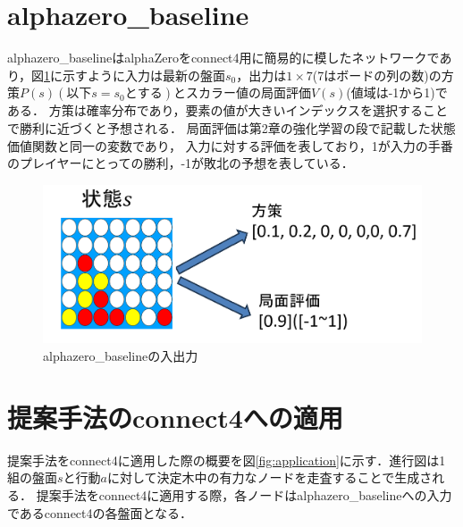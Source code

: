 \section{alphazero\_baseline}
alphazero\_baselineはalphaZeroをconnect4用に簡易的に模したネットワークであり，図\ref{fig:baseline}に示すように入力は最新の盤面$s_0$，出力は$1\times7$(7はボードの列の数)の方策$P(s)(以下s=s_0とする)$とスカラー値の局面評価$V(s)$(値域は-1から1)である．
方策は確率分布であり，要素の値が大きいインデックスを選択することで勝利に近づくと予想される．
局面評価は第2章の強化学習の段で記載した状態価値関数と同一の変数であり，
入力に対する評価を表しており，1が入力の手番のプレイヤーにとっての勝利，-1が敗北の予想を表している．

\begin{figure}[t]
    \centering
    \includegraphics[trim={0cm 0cm 0cm 0cm},clip]{./figure/baseline.png}

    \caption{alphazero\_baselineの入出力}
    \label{fig:baseline}
\end{figure}
\section{提案手法のconnect4への適用}
提案手法をconnect4に適用した際の概要を図\ref{fig:application}に示す．進行図は1組の盤面$s$と行動$a$に対して決定木中の有力なノードを走査することで生成される．
提案手法をconnect4に適用する際，各ノードはalphazero\_baselineへの入力であるconnect4の各盤面となる．


